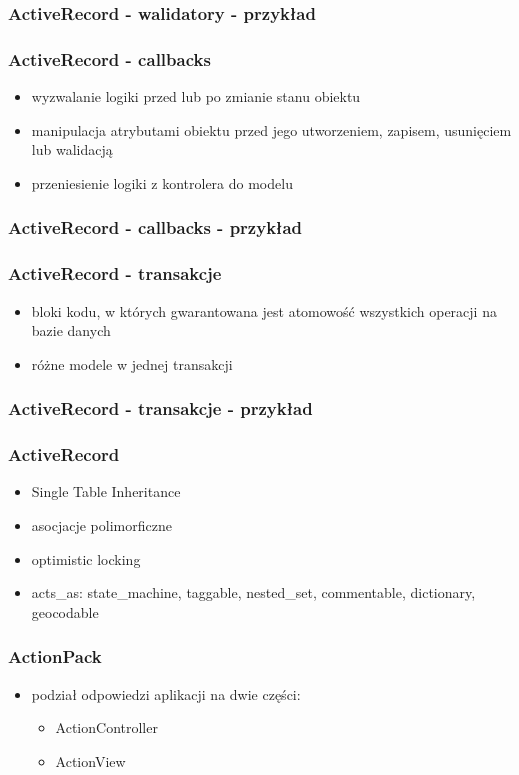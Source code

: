 \documentclass[12t]{beamer}
\begin{document}
\begin{frame}
  \frametitle{ActiveRecord - walidatory - przykład}
  
\end{frame}

\begin{frame}
  \frametitle{ActiveRecord - callbacks}
  \begin{itemize}
  \item wyzwalanie logiki przed lub po zmianie stanu obiektu
  \item manipulacja atrybutami obiektu przed jego utworzeniem,
    zapisem, usunięciem lub walidacją
  \item przeniesienie logiki z kontrolera do modelu
  \end{itemize}
\end{frame}

\begin{frame}
  \frametitle{ActiveRecord - callbacks - przykład}
  
\end{frame}

\begin{frame}
  \frametitle{ActiveRecord - transakcje}
  \begin{itemize}
  \item bloki kodu, w których gwarantowana jest atomowość wszystkich
    operacji na bazie danych
  \item różne modele w jednej transakcji
  \end{itemize}
\end{frame}

\begin{frame}
  \frametitle{ActiveRecord - transakcje - przykład}
  
\end{frame}

\begin{frame}
  \frametitle{ActiveRecord}
  \begin{itemize}
  \item Single Table Inheritance
  \item asocjacje polimorficzne
  \item optimistic locking
  \item acts\_as: state\_machine, taggable, nested\_set, commentable,
    dictionary, geocodable
  \end{itemize}
\end{frame}

\begin{frame}
  \frametitle{ActionPack}
  \begin{itemize}
  \item podział odpowiedzi aplikacji na dwie części:
    \begin{itemize}
    \item ActionController
    \item ActionView
    \end{itemize}
  \end{itemize}
\end{frame}
\end{document}
